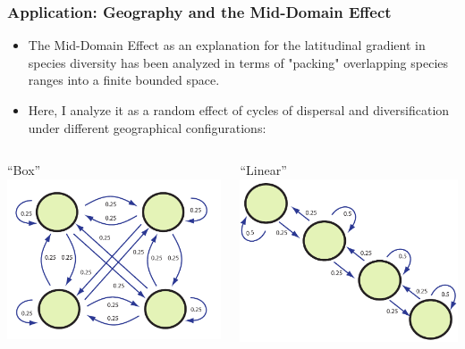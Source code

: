 \documentclass[11pt,t]{beamer}
\begin{document}
\begin{frame}
	\frametitle{Application: Geography and the Mid-Domain Effect}
	
	\begin{itemize}
		\item The Mid-Domain Effect as an explanation for the latitudinal gradient in species diversity has been analyzed in terms of "packing" overlapping species ranges into a finite bounded space.
		\item Here, I analyze it as a random effect of cycles of dispersal and diversification under different geographical configurations:	
	\end{itemize}
	
		\begin{columns}		
			\begin{column}[c]{0.40 \textwidth}
				\begin{center}
				``Box''
				\includegraphics[scale=0.3]{box-model.pdf}
				\end{center}
			\end{column}
			
			\begin{column}[c]{0.40 \textwidth}
				\begin{center}
				``Linear''			
				\includegraphics[scale=0.3]{linear-model.pdf}
				\end{center}				
			\end{column}							
		\end{columns}


\end{frame}
\end{document}
